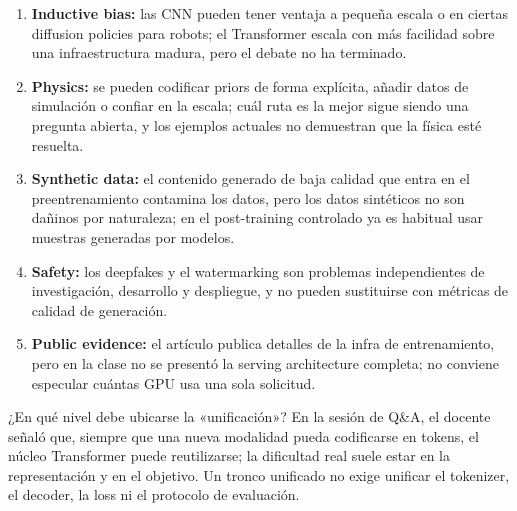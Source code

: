 \documentclass[a4paper]{article}
\begin{document}
\begin{enumerate}
  \item \textbf{Inductive bias:} las CNN pueden tener ventaja a pequeña escala o en ciertas diffusion policies para robots; el Transformer escala con más facilidad sobre una infraestructura madura, pero el debate no ha terminado.
  \item \textbf{Physics:} se pueden codificar priors de forma explícita, añadir datos de simulación o confiar en la escala; cuál ruta es la mejor sigue siendo una pregunta abierta, y los ejemplos actuales no demuestran que la física esté resuelta.
  \item \textbf{Synthetic data:} el contenido generado de baja calidad que entra en el preentrenamiento contamina los datos, pero los datos sintéticos no son dañinos por naturaleza; en el post-training controlado ya es habitual usar muestras generadas por modelos.
  \item \textbf{Safety:} los deepfakes y el watermarking son problemas independientes de investigación, desarrollo y despliegue, y no pueden sustituirse con métricas de calidad de generación.
  \item \textbf{Public evidence:} el artículo publica detalles de la infra de entrenamiento, pero en la clase no se presentó la serving architecture completa; no conviene especular cuántas GPU usa una sola solicitud.
\end{enumerate}

\begin{knowledgebox}{¿En qué nivel debe ubicarse la «unificación»?}
En la sesión de Q\&A, el docente señaló que, siempre que una nueva modalidad pueda codificarse en tokens, el núcleo Transformer puede reutilizarse; la dificultad real suele estar en la representación y en el objetivo. Un tronco unificado no exige unificar el tokenizer, el decoder, la loss ni el protocolo de evaluación.
\end{knowledgebox}


\end{document}

